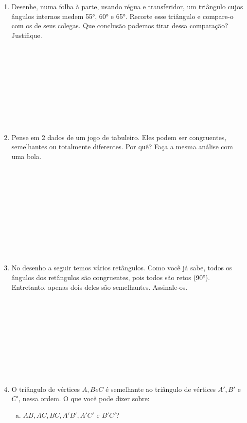 \documentclass[a4paper,14pt]{article}
\begin{document}
\begin{multicols}{2}
\begin{enumerate}
			 \\
			\item Desenhe, numa folha à parte, usando régua e transferidor, um triângulo cujos ângulos internos medem 55°, 60° e 65°. Recorte esse triângulo e compare-o com os de seus colegas. Que conclusão podemos tirar dessa comparação? Justifique. \\\\\\\\\\\\\\\\\\\\
			\item Pense em 2 dados de um jogo de tabuleiro. Eles podem ser congruentes, semelhantes ou totalmente diferentes. Por quê? Faça a mesma análise com uma bola. \\\\\\\\\\\\\\\\\\\\\\
			\item No desenho a seguir temos vários retângulos. Como você já sabe, todos os ângulos dos retângulos são congruentes, pois todos são retos (90°). Entretanto, apenas dois deles são semelhantes. Assinale-os. \\\\\\\\\\\\\\\\\\\\
			\item O triângulo de vértices $A, B e C$ é semelhante ao triângulo de vértices $A', B'$ e $C'$, nessa ordem. O que você pode dizer sobre: 
			\begin{enumerate}[a)]
				\item $AB, AC, BC, A'B', A'C'$ e $B'C'$? \\\\\\\\\\\\\\\\

\end{enumerate}
\end{enumerate}
\end{multicols}
\end{document}
